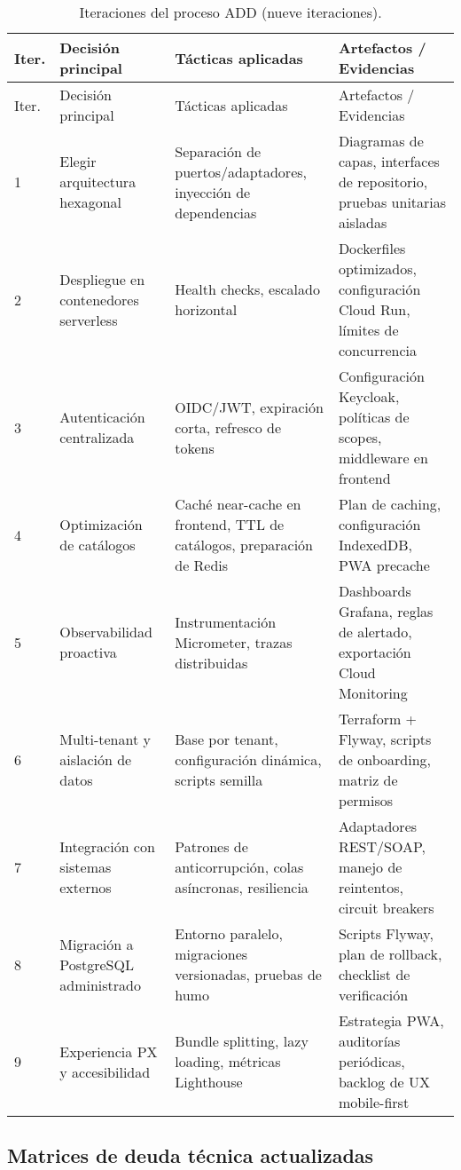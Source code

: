 \documentclass[12pt,a4paper]{article}
\begin{document}
\begin{longtable}{p{0.8cm} p{4.5cm} p{5.2cm} p{5.2cm}}
    \caption{Iteraciones del proceso ADD (nueve iteraciones).}\label{tab:add-iteraciones-fase3}\\
    \toprule
    Iter. & Decisión principal & Tácticas aplicadas & Artefactos / Evidencias \\
    \midrule
    \endfirsthead
    \toprule
    Iter. & Decisión principal & Tácticas aplicadas & Artefactos / Evidencias \\
    \midrule
    \endhead
    1 & Elegir arquitectura hexagonal & Separación de puertos/adaptadores, inyección de dependencias & Diagramas de capas, interfaces de repositorio, pruebas unitarias aisladas \\
    2 & Despliegue en contenedores serverless & Health checks, escalado horizontal & Dockerfiles optimizados, configuración Cloud Run, límites de concurrencia \\
    3 & Autenticación centralizada & OIDC/JWT, expiración corta, refresco de tokens & Configuración Keycloak, políticas de scopes, middleware en frontend \\
    4 & Optimización de catálogos & Caché near-cache en frontend, TTL de catálogos, preparación de Redis & Plan de caching, configuración IndexedDB, PWA precache \\
    5 & Observabilidad proactiva & Instrumentación Micrometer, trazas distribuidas & Dashboards Grafana, reglas de alertado, exportación Cloud Monitoring \\
    6 & Multi-tenant y aislación de datos & Base por tenant, configuración dinámica, scripts semilla & Terraform + Flyway, scripts de onboarding, matriz de permisos \\
    7 & Integración con sistemas externos & Patrones de anticorrupción, colas asíncronas, resiliencia & Adaptadores REST/SOAP, manejo de reintentos, circuit breakers \\
    8 & Migración a PostgreSQL administrado & Entorno paralelo, migraciones versionadas, pruebas de humo & Scripts Flyway, plan de rollback, checklist de verificación \\
    9 & Experiencia PX y accesibilidad & Bundle splitting, lazy loading, métricas Lighthouse & Estrategia PWA, auditorías periódicas, backlog de UX mobile-first \\
    \bottomrule
\end{longtable}

\subsection{Matrices de deuda técnica actualizadas}
\end{document}
